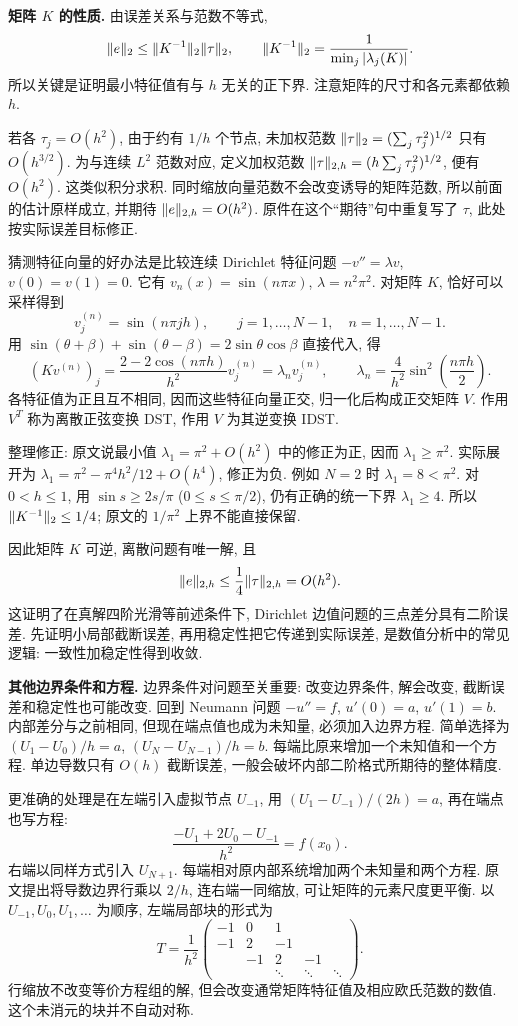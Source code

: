 \textbf{矩阵 $K$ 的性质.} 由误差关系与范数不等式,
\[
\lVert e\rVert_2\leq\lVert K^{-1}\rVert_2\lVert \tau\rVert_2,\qquad
\lVert K^{-1}\rVert_2=\frac1{\min_j|\lambda_j(K)|}.
\]
所以关键是证明最小特征值有与 $h$ 无关的正下界. 注意矩阵的尺寸和各元素都依赖 $h$.

若各 $\tau_j=O(h^2)$, 由于约有 $1/h$ 个节点, 未加权范数 $\lVert \tau\rVert_2=(\sum_j\tau_j^2)^{1/2}$ 只有 $O(h^{3/2})$. 为与连续 $L^2$ 范数对应, 定义加权范数 $\lVert \tau\rVert_{2,h}=(h\sum_j\tau_j^2)^{1/2}$, 便有 $O(h^2)$. 这类似积分求积. 同时缩放向量范数不会改变诱导的矩阵范数, 所以前面的估计原样成立, 并期待 $\lVert e\rVert_{2,h}=O(h^2)$. 原件在这个“期待”句中重复写了 $\tau$, 此处按实际误差目标修正.

猜测特征向量的好办法是比较连续 Dirichlet 特征问题 $-v''=\lambda v$, $v(0)=v(1)=0$. 它有 $v_n(x)=\sin(n\pi x)$, $\lambda=n^2\pi^2$. 对矩阵 $K$, 恰好可以采样得到
\[
v_j^{(n)}=\sin(n\pi jh),\qquad j=1,\ldots,N-1,\quad n=1,\ldots,N-1.
\]
用 $\sin(\theta+\beta)+\sin(\theta-\beta)=2\sin\theta\cos\beta$ 直接代入, 得
\[
(Kv^{(n)})_j=\frac{2-2\cos(n\pi h)}{h^2}v_j^{(n)}
=\lambda_nv_j^{(n)},\qquad
\lambda_n=\frac4{h^2}\sin^2\left(\frac{n\pi h}{2}\right).
\]
各特征值为正且互不相同, 因而这些特征向量正交, 归一化后构成正交矩阵 $V$. 作用 $V^T$ 称为离散正弦变换 DST, 作用 $V$ 为其逆变换 IDST.

\begin{remark}
整理修正: 原文说最小值 $\lambda_1=\pi^2+O(h^2)$ 中的修正为正, 因而 $\lambda_1\geq\pi^2$. 实际展开为 $\lambda_1=\pi^2-\pi^4h^2/12+O(h^4)$, 修正为负. 例如 $N=2$ 时 $\lambda_1=8<\pi^2$. 对 $0<h\leq1$, 用 $\sin s\geq2s/\pi$ ($0\leq s\leq\pi/2$), 仍有正确的统一下界 $\lambda_1\geq4$. 所以 $\lVert K^{-1}\rVert_2\leq1/4$; 原文的 $1/\pi^2$ 上界不能直接保留.
\end{remark}

因此矩阵 $K$ 可逆, 离散问题有唯一解, 且
\[
\lVert e\rVert_{2,h}\leq\frac14\lVert \tau\rVert_{2,h}=O(h^2).
\]
这证明了在真解四阶光滑等前述条件下, Dirichlet 边值问题的三点差分具有二阶误差. 先证明小局部截断误差, 再用稳定性把它传递到实际误差, 是数值分析中的常见逻辑: 一致性加稳定性得到收敛.

\textbf{其他边界条件和方程.} 边界条件对问题至关重要: 改变边界条件, 解会改变, 截断误差和稳定性也可能改变. 回到 Neumann 问题 $-u''=f$, $u'(0)=a$, $u'(1)=b$. 内部差分与之前相同, 但现在端点值也成为未知量, 必须加入边界方程. 简单选择为 $(U_1-U_0)/h=a$, $(U_N-U_{N-1})/h=b$. 每端比原来增加一个未知值和一个方程. 单边导数只有 $O(h)$ 截断误差, 一般会破坏内部二阶格式所期待的整体精度.

更准确的处理是在左端引入虚拟节点 $U_{-1}$, 用 $(U_1-U_{-1})/(2h)=a$, 再在端点也写方程:
\[
\frac{-U_1+2U_0-U_{-1}}{h^2}=f(x_0).
\]
右端以同样方式引入 $U_{N+1}$. 每端相对原内部系统增加两个未知量和两个方程. 原文提出将导数边界行乘以 $2/h$, 连右端一同缩放, 可让矩阵的元素尺度更平衡. 以 $U_{-1},U_0,U_1,\ldots$ 为顺序, 左端局部块的形式为
\[
T=\frac1{h^2}\begin{pmatrix}
-1&0&1&&\\-1&2&-1&&\\&-1&2&-1&\\&&\ddots&\ddots&\ddots
\end{pmatrix}.
\]
行缩放不改变等价方程组的解, 但会改变通常矩阵特征值及相应欧氏范数的数值. 这个未消元的块并不自动对称.

